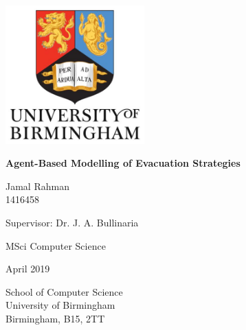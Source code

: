 \begin{titlepage}
   \begin{center}
        \vspace*{1cm}
        
        \includegraphics[width=0.4\textwidth]{images/crest.jpg}
        \vspace{2.5cm}
    
        {\Large\textbf{Agent-Based Modelling of Evacuation Strategies}}
 
        \vspace{2.5cm}
 
        Jamal Rahman\\
        1416458\\
 
        \vspace{0.5cm}
        
        Supervisor: Dr. J. A. Bullinaria
 
        \vspace{0.5cm}
        
        MSci Computer Science
        
        \vspace{0.5cm}
        
        April 2019
 
       \vfill
 
       \vspace{0.8cm}
 
 
       School of Computer Science\\
       University of Birmingham\\
       Birmingham, B15, 2TT\\
 
   \end{center}
\end{titlepage}